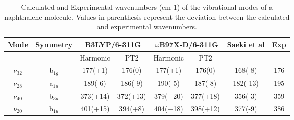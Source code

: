 \begin{table}[htb]
	\caption{Calculated and Experimental wavenumbers (cm-1)\cite{boys1970calculation} of the vibrational modes of a naphthalene molecule. Values in parenthesis represent the deviation between the calculated and experimental wavenumbers.}
	\begin{center}
		\begin{tabular}{c c c c c c c c}
		\toprule
		\textbf{Mode} & \textbf{Symmetry} & \multicolumn{2}{p{3.4cm}}{\textbf{B3LYP/6-311G}} & \multicolumn{2}{p{3.7cm}}{\textbf{$\omega$B97X-D/6-311G}} & \textbf{Saeki et al\cite{saeki2006theoretical}} & \textbf{Exp\cite{gonzalez2000quantum}}\\
		\midrule
		&  & Harmonic & PT2 & Harmonic & PT2 &  & \\
		\cline{3-6}
		$\nu_{32}$& b$_{1g}$ &	177(+1) & 176(0) & 177(+1) & 176(0) & 168(-8) & 176\\
		$\nu_{28}$ & a$_{1u}$ & 189(-6) & 186(-9) & 190(-5) & 187(-8) & 182(-13) & 195\\
		$\nu_{40}$ & b$_{3u}$ & 373(+14) & 372(+13) & 379(+20) & 377(+18) & 356(-3) & 359\\
		$\nu_{20}$ & b$_{1u}$ & 401(+15) & 394(+8) & 404(+18) & 398(+12) & 377(-9) & 386\\
		\bottomrule				
		\end{tabular}
\end{center}
\end{table}


